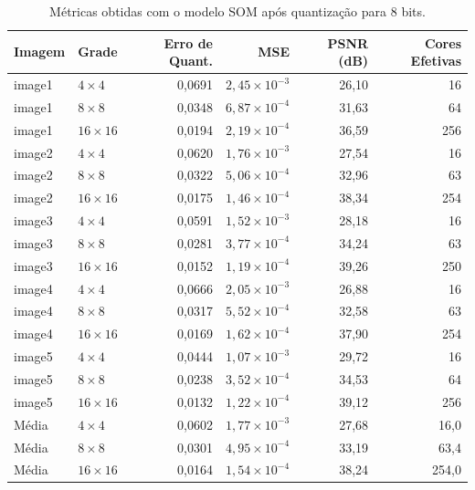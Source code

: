 \documentclass[11pt,a4paper]{article}
\begin{document}
\begin{table}[H]
\centering
\caption{Métricas obtidas com o modelo SOM após quantização para $8$ bits.}
\label{tab:som}
\small
\begin{tabular}{llrrrr}
\toprule
Imagem & Grade & Erro de Quant. & MSE & PSNR (dB) & Cores Efetivas \\
\midrule
image1 & $4 \times 4$   & 0,0691 & $2{,}45 \times 10^{-3}$ & 26,10 & 16 \\
image1 & $8 \times 8$   & 0,0348 & $6{,}87 \times 10^{-4}$ & 31,63 & 64 \\
image1 & $16 \times 16$ & 0,0194 & $2{,}19 \times 10^{-4}$ & 36,59 & 256 \\
\midrule
image2 & $4 \times 4$   & 0,0620 & $1{,}76 \times 10^{-3}$ & 27,54 & 16 \\
image2 & $8 \times 8$   & 0,0322 & $5{,}06 \times 10^{-4}$ & 32,96 & 63 \\
image2 & $16 \times 16$ & 0,0175 & $1{,}46 \times 10^{-4}$ & 38,34 & 254 \\
\midrule
image3 & $4 \times 4$   & 0,0591 & $1{,}52 \times 10^{-3}$ & 28,18 & 16 \\
image3 & $8 \times 8$   & 0,0281 & $3{,}77 \times 10^{-4}$ & 34,24 & 63 \\
image3 & $16 \times 16$ & 0,0152 & $1{,}19 \times 10^{-4}$ & 39,26 & 250 \\
\midrule
image4 & $4 \times 4$   & 0,0666 & $2{,}05 \times 10^{-3}$ & 26,88 & 16 \\
image4 & $8 \times 8$   & 0,0317 & $5{,}52 \times 10^{-4}$ & 32,58 & 63 \\
image4 & $16 \times 16$ & 0,0169 & $1{,}62 \times 10^{-4}$ & 37,90 & 254 \\
\midrule
image5 & $4 \times 4$   & 0,0444 & $1{,}07 \times 10^{-3}$ & 29,72 & 16 \\
image5 & $8 \times 8$   & 0,0238 & $3{,}52 \times 10^{-4}$ & 34,53 & 64 \\
image5 & $16 \times 16$ & 0,0132 & $1{,}22 \times 10^{-4}$ & 39,12 & 256 \\
\midrule
Média  & $4 \times 4$   & 0,0602 & $1{,}77 \times 10^{-3}$ & 27,68 & 16,0 \\
Média  & $8 \times 8$   & 0,0301 & $4{,}95 \times 10^{-4}$ & 33,19 & 63,4 \\
Média  & $16 \times 16$ & 0,0164 & $1{,}54 \times 10^{-4}$ & 38,24 & 254,0 \\
\bottomrule
\end{tabular}
\end{table}
\end{document}
